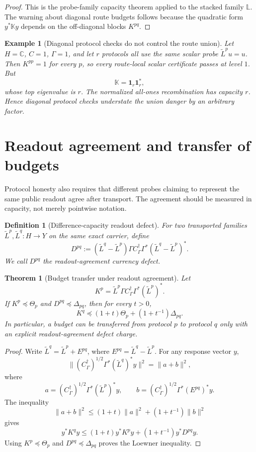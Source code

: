 \documentclass[11pt]{article}
\newtheorem{theorem}{Theorem}
\newtheorem{definition}{Definition}
\newtheorem{example}{Example}
\newcommand{\Loewner}{\preceq}
\begin{document}
\begin{proof}
This is the probe-family capacity theorem applied to the stacked family $\mathbb L$.  The warning about diagonal route budgets follows because the quadratic form $y^*\mathbb Ky$ depends on the off-diagonal blocks $K^{pq}$.
\end{proof}

\begin{example}[Diagonal protocol checks do not control the route union]
Let $H=\mathbb C$, $C=1$, $\Gamma=1$, and let $r$ protocols all use the same scalar probe $\widetilde L^p u=u$.  Then $K^{pp}=1$ for every $p$, so every route-local scalar certificate passes at level $1$.  But
\[
  \mathbb K=\mathbf 1_r\mathbf 1_r^*,
\]
whose top eigenvalue is $r$.  The normalized all-ones recombination has capacity $r$.  Hence diagonal protocol checks understate the union danger by an arbitrary factor.
\end{example}

\section{Readout agreement and transfer of budgets}

Protocol honesty also requires that different probes claiming to represent the same public readout agree after transport.  The agreement should be measured in capacity, not merely pointwise notation.

\begin{definition}[Difference-capacity readout defect]
For two transported families $\widetilde L^p,\widetilde L^q:H\to Y$ on the same exact carrier, define
\[
  D^{pq}:=(\widetilde L^q-\widetilde L^p)\Gamma C_\Gamma^\dagger\Gamma^*(\widetilde L^q-\widetilde L^p)^*.
\]
We call $D^{pq}$ the readout-agreement currency defect.
\end{definition}

\begin{theorem}[Budget transfer under readout agreement]
Let
\[
  K^p=\widetilde L^p\Gamma C_\Gamma^\dagger\Gamma^*(\widetilde L^p)^*.
\]
If $K^p\Loewner\Theta_p$ and $D^{pq}\Loewner\Delta_{pq}$, then for every $t>0$,
\[
  K^q
  \Loewner
  (1+t)\Theta_p+(1+t^{-1})\Delta_{pq}.
\]
In particular, a budget can be transferred from protocol $p$ to protocol $q$ only with an explicit readout-agreement defect charge.
\end{theorem}

\begin{proof}
Write $\widetilde L^q=\widetilde L^p+E^{pq}$, where $E^{pq}=\widetilde L^q-\widetilde L^p$.  For any response vector $y$,
\[
  \|(C_\Gamma^\dagger)^{1/2}\Gamma^*(\widetilde L^q)^*y\|^2
  =
  \|a+b\|^2,
\]
where
\[
  a=(C_\Gamma^\dagger)^{1/2}\Gamma^*(\widetilde L^p)^*y,
  \qquad
  b=(C_\Gamma^\dagger)^{1/2}\Gamma^*(E^{pq})^*y.
\]
The inequality
\[
  \|a+b\|^2\le(1+t)\|a\|^2+(1+t^{-1})\|b\|^2
\]
gives
\[
  y^*K^qy\le(1+t)y^*K^py+(1+t^{-1})y^*D^{pq}y.
\]
Using $K^p\Loewner\Theta_p$ and $D^{pq}\Loewner\Delta_{pq}$ proves the Loewner inequality.
\end{proof}
\end{document}

